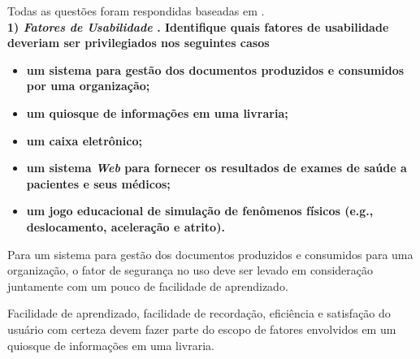 \documentclass[
	article,			%
	11pt,				%
	oneside,			%
	a4paper,			%
	english,			%
	brazil,				%
	sumario=tradicional
	]{abntex2}
\begin{document}
\frenchspacing 



\maketitle



\textual


Todas as questões foram respondidas baseadas em .\\

\textbf{1) \textit{Fatores de Usabilidade} . Identifique quais fatores de usabilidade deveriam ser privilegiados nos seguintes casos}

\begin{itemize}
	\item \textbf{um sistema para gestão dos documentos produzidos  e consumidos por uma organização;}
	\item \textbf{um quiosque de informações em uma livraria;}
	\item \textbf{um caixa eletrônico;}
	\item \textbf{um sistema \textit{Web} para fornecer os resultados de exames de saúde a pacientes e seus médicos;}
	\item \textbf{um jogo educacional de simulação de fenômenos físicos (e.g., deslocamento, aceleração e atrito).}
\end{itemize}

Para um sistema para gestão dos documentos produzidos e consumidos para uma organização, o fator de segurança no uso deve ser levado em consideração juntamente com um pouco de facilidade de aprendizado.

Facilidade de aprendizado, facilidade de recordação, eficiência e satisfação do usuário com certeza devem fazer parte do escopo de fatores envolvidos em um quiosque de informações em uma livraria.
\end{document}
